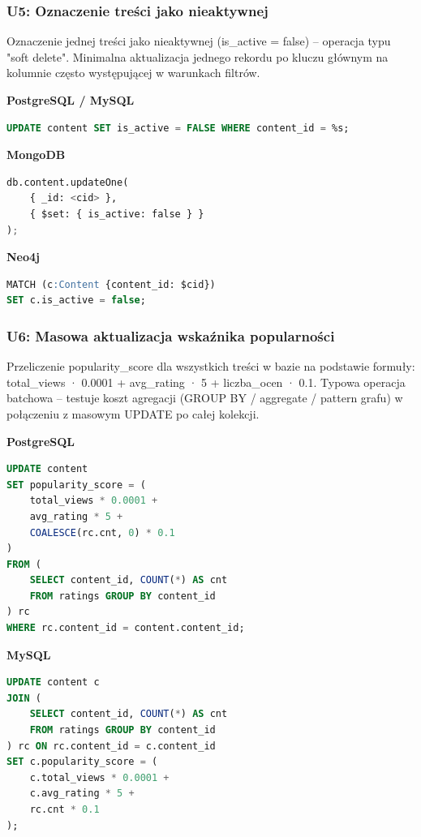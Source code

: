 \subsubsection{U5: Oznaczenie treści jako nieaktywnej}

Oznaczenie jednej treści jako nieaktywnej (is\_active = false) -- operacja
typu "soft delete". Minimalna aktualizacja jednego rekordu po kluczu głównym na kolumnie
często występującej w warunkach filtrów.

\textbf{PostgreSQL / MySQL}
\begin{lstlisting}[language=SQL]
UPDATE content SET is_active = FALSE WHERE content_id = %s;
\end{lstlisting}

\textbf{MongoDB}
\begin{lstlisting}[language=Python]
db.content.updateOne(
    { _id: <cid> },
    { $set: { is_active: false } }
);
\end{lstlisting}

\textbf{Neo4j}
\begin{lstlisting}[language=SQL]
MATCH (c:Content {content_id: $cid})
SET c.is_active = false;
\end{lstlisting}


\subsubsection{U6: Masowa aktualizacja wskaźnika popularności}

Przeliczenie popularity\_score dla wszystkich treści w bazie na podstawie
formuły: total\_views · 0.0001 + avg\_rating · 5 + liczba\_ocen · 0.1.
Typowa operacja batchowa -- testuje koszt agregacji (GROUP BY / aggregate /
pattern grafu) w połączeniu z masowym UPDATE po całej kolekcji.

\textbf{PostgreSQL}
\begin{lstlisting}[language=SQL]
UPDATE content
SET popularity_score = (
    total_views * 0.0001 +
    avg_rating * 5 +
    COALESCE(rc.cnt, 0) * 0.1
)
FROM (
    SELECT content_id, COUNT(*) AS cnt
    FROM ratings GROUP BY content_id
) rc
WHERE rc.content_id = content.content_id;
\end{lstlisting}

\textbf{MySQL}
\begin{lstlisting}[language=SQL]
UPDATE content c
JOIN (
    SELECT content_id, COUNT(*) AS cnt
    FROM ratings GROUP BY content_id
) rc ON rc.content_id = c.content_id
SET c.popularity_score = (
    c.total_views * 0.0001 +
    c.avg_rating * 5 +
    rc.cnt * 0.1
);
\end{lstlisting}

